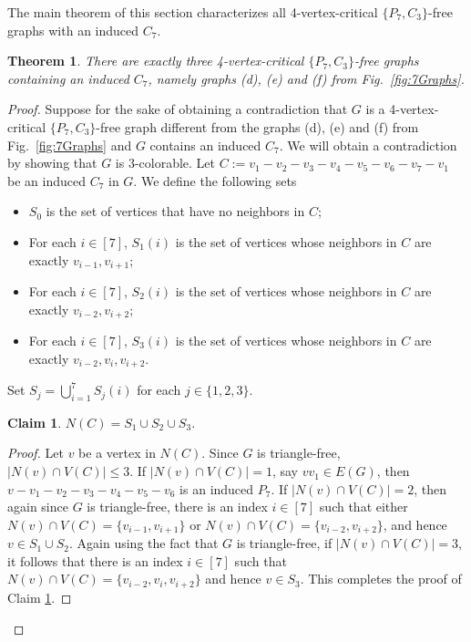 \documentclass[11pt,a4paper]{article}
\newtheorem{theorem}{Theorem}[section]
\theoremstyle{definition}
\newtheorem{claim}{\indent Claim}
\begin{document}
The main theorem of this section characterizes all 4-vertex-critical $\{P_7,C_3\}$-free graphs with an induced $C_7$.
\begin{theorem}\label{thm:contain C_7}
    There are exactly three 4-vertex-critical $\{P_7,C_3\}$-free graphs containing an induced $C_7$, namely graphs (d), (e) and (f) from Fig.~\ref{fig:7Graphs}.
\end{theorem}
\begin{proof}
    Suppose for the sake of obtaining a contradiction that $G$ is a 4-vertex-critical $\{P_7,C_3\}$-free graph different from the graphs (d), (e) and (f) from Fig.~\ref{fig:7Graphs} and $G$ contains an induced $C_7$. We will obtain a contradiction by showing that $G$ is 3-colorable. 
    Let $C:=v_1-v_2-v_3-v_4-v_5-v_6-v_7-v_1$ be an induced $C_7$ in $G$. We define the following sets
    \begin{itemize}
        \item $S_0$ is the set of vertices that have no neighbors in $C$; 
        \item For each $i \in [7]$, $S_1(i)$ is the set of vertices whose neighbors in $C$ are exactly $v_{i-1},v_{i+1}$; 
        \item For each $i \in [7]$, $S_2(i)$ is the set of vertices whose neighbors in $C$ are exactly $v_{i-2},v_{i+2}$; 
        \item For each $i \in [7]$, $S_3(i)$ is the set of vertices whose neighbors in $C$ are exactly $v_{i-2},v_i,v_{i+2}$.
    \end{itemize}
    Set $S_j=\bigcup_{i=1}^{7} S_j(i)$ for each $j\in \{1,2,3\}$. 

    \begin{claim}\label{claim:neighbors of C}
        $N(C)=S_1\cup S_2\cup S_3$.
    \end{claim}
    \begin{proof}
        Let $v$ be a vertex in $N(C)$.
        Since $G$ is triangle-free, $|N(v)\cap V(C)|\leq 3$. 
        If $|N(v)\cap V(C)|=1$, say $vv_1\in E(G)$, then $v-v_1-v_2-v_3-v_4-v_5-v_6$ is an induced $P_7$. 
        If $|N(v)\cap V(C)|=2$, then again since $G$ is triangle-free, there is an index $i\in [7]$ such that either $N(v)\cap V(C)=\{v_{i-1},v_{i+1}\}$ or $N(v)\cap V(C)=\{v_{i-2},v_{i+2}\}$, and hence $v\in S_1\cup S_2$. 
        Again using the fact that $G$ is triangle-free, if $|N(v)\cap V(C)|=3$, it follows that there is an index $i\in [7]$ such that $N(v)\cap V(C)=\{v_{i-2},v_i,v_{i+2}\}$ and hence $v\in S_3$. 
        This completes the proof of Claim \ref{claim:neighbors of C}.
    \end{proof}


\end{proof}
\end{document}
